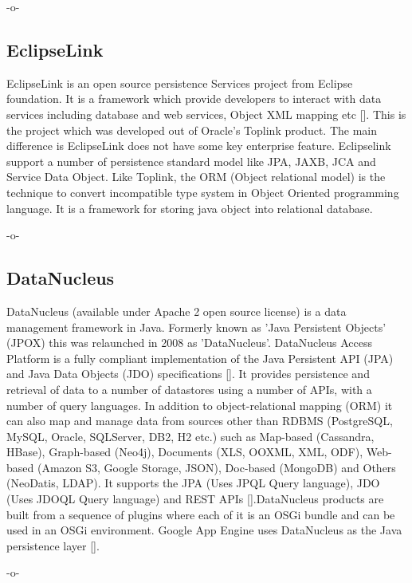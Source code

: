      -o-

\subsection{EclipseLink}

EclipseLink is an open source persistence Services project from
Eclipse foundation. It is a framework which provide developers to
interact with data services including database and web services,
Object XML mapping etc [\cite{www-eclipselink}]. This is the project
which was developed out of Oracle's Toplink product. The main
difference is EclipseLink does not have some key enterprise
feature. Eclipselink support a number of persistence standard model
like JPA, JAXB, JCA and Service Data Object. Like Toplink, the ORM
(Object relational model) is the technique to convert incompatible
type system in Object Oriented programming language. It is a framework
for storing java object into relational database.

     -o-
     
\subsection{DataNucleus}

DataNucleus (available under Apache 2 open source license) is a data
management framework in Java. Formerly known as 'Java Persistent
Objects' (JPOX) this was relaunched in 2008 as
'DataNucleus'. DataNucleus Access Platform is a fully compliant
implementation of the Java Persistent API (JPA) and Java Data Objects
(JDO) specifications [\cite{www-DataNucleusWiki}]. It provides
persistence and retrieval of data to a number of datastores using a
number of APIs, with a number of query languages. In addition to
object-relational mapping (ORM) it can also map and manage data from
sources other than RDBMS (PostgreSQL, MySQL, Oracle, SQLServer, DB2,
H2 etc.) such as Map-based (Cassandra, HBase), Graph-based (Neo4j),
Documents (XLS, OOXML, XML, ODF), Web-based (Amazon S3, Google
Storage, JSON), Doc-based (MongoDB) and Others (NeoDatis, LDAP). It
supports the JPA (Uses JPQL Query language), JDO (Uses JDOQL Query
language) and REST APIs [\cite{www-DataNucleus}].DataNucleus products
are built from a sequence of plugins where each of it is an OSGi
bundle and can be used in an OSGi environment. Google App Engine uses
DataNucleus as the Java persistence
layer [\cite{www-DataNucleusPerformance}].

     -o-
     

